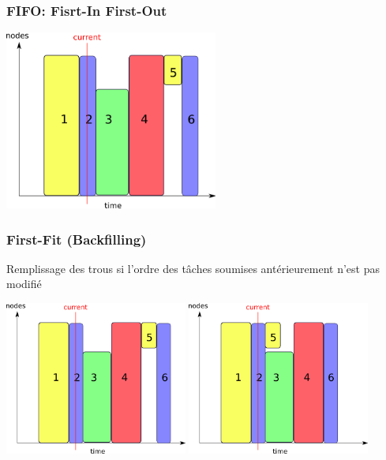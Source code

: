 \documentclass{beamer}
\begin{document}
\begin{frame}
	\frametitle{FIFO: Fisrt-In First-Out}
	\begin{center}
		\includegraphics[width=7cm]{fifo.png}
	\end{center}

\end{frame}

\begin{frame}
	\frametitle{ First-Fit (Backfilling)}
	Remplissage des trous si l'ordre des tâches soumises antérieurement n'est pas modifié
	\begin{center}
			\includegraphics[width=6cm]{fifo.png}
		\includegraphics[width=6cm]{cbf.png}
	\end{center}

\end{frame}
\end{document}
